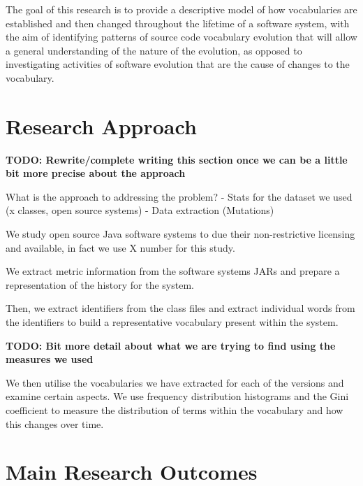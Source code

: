 The goal of this research is to provide a descriptive model of how vocabularies are established and then changed throughout the lifetime of a software system, with the aim of identifying patterns of source code vocabulary evolution that will allow a general understanding of the nature of the evolution, as opposed to investigating activities of software evolution that are the cause of changes to the vocabulary.


\section{Research Approach} %
\label{sec:research_approach}

\textbf{TODO: Rewrite/complete writing this section once we can be a little bit more precise about the approach}

What is the approach to addressing the problem?
- Stats for the dataset we used (x classes, open source systems)
- Data extraction (Mutations)

We study open source Java software systems to due their non-restrictive licensing and available, in fact we use X number for this study.

We extract metric information from the software systems JARs and prepare a representation of the history for the system.

Then, we extract identifiers from the class files and extract individual words from the identifiers to build a representative vocabulary present within the system.

\textbf{TODO: Bit more detail about what we are trying to find using the measures we used}

We then utilise the vocabularies we have extracted for each of the versions and examine certain aspects. We use frequency distribution histograms and the Gini coefficient to measure the distribution of terms within the vocabulary and how this changes over time.


\section{Main Research Outcomes} %
\label{sec:main_research_outcomes}

% 
% 
% 

